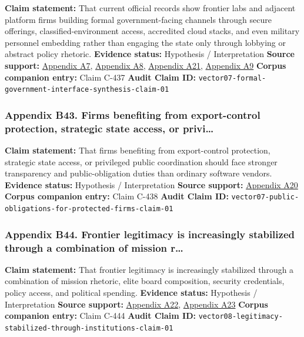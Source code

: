 \documentclass[
  american,
  11pt,
  letterpaper,
]{article}
\begin{document}
\textbf{Claim statement:} That current official records show frontier
labs and adjacent platform firms building formal government-facing
channels through secure offerings, classified-environment access,
accredited cloud stacks, and even military personnel embedding rather
than engaging the state only through lobbying or abstract policy
rhetoric. \textbf{Evidence status:} Hypothesis / Interpretation
\textbf{Source support:}
\hyperref[appendix-a7-introducing-openai-for-government]{Appendix A7},
\hyperref[appendix-a8-claude-gov-models-for-u-s-national-security-customers]{Appendix
A8},
\hyperref[appendix-a21-anthropic-and-palantir-partner-to-bring-claude-ai-models-to-aws-for-u-s-government-intelligence-and-defense-operations]{Appendix
A21},
\hyperref[appendix-a9-army-launches-detachment-201-executive-innovation-corps-to-drive-tech-transformation]{Appendix
A9} \textbf{Corpus companion entry:} Claim C-437 \textbf{Audit Claim
ID:} \texttt{vector07-formal-government-interface-synthesis-claim-01}

\subsubsection{Appendix B43. Firms benefiting from export-control
protection, strategic state access, or
privi\ldots{}}\label{appendix-b43-firms-benefiting-from-export-control-protection-strategic-state-access-or-privi}

\textbf{Claim statement:} That firms benefiting from export-control
protection, strategic state access, or privileged public coordination
should face stronger transparency and public-obligation duties than
ordinary software vendors. \textbf{Evidence status:} Hypothesis /
Interpretation \textbf{Source support:}
\hyperref[appendix-a20-openais-proposals-for-the-us-ai-action-plan]{Appendix
A20} \textbf{Corpus companion entry:} Claim C-438 \textbf{Audit Claim
ID:} \texttt{vector07-public-obligations-for-protected-firms-claim-01}

\subsubsection{Appendix B44. Frontier legitimacy is increasingly
stabilized through a combination of mission
r\ldots{}}\label{appendix-b44-frontier-legitimacy-is-increasingly-stabilized-through-a-combination-of-mission-r}

\textbf{Claim statement:} That frontier legitimacy is increasingly
stabilized through a combination of mission rhetoric, elite board
composition, security credentials, policy access, and political
spending. \textbf{Evidence status:} Hypothesis / Interpretation
\textbf{Source support:}
\hyperref[appendix-a22-anthropic-outspends-openai-in-biggest-ever-lobbying-quarter]{Appendix
A22},
\hyperref[appendix-a23-leading-the-future-committee-overview]{Appendix
A23} \textbf{Corpus companion entry:} Claim C-444 \textbf{Audit Claim
ID:}
\texttt{vector08-legitimacy-stabilized-through-institutions-claim-01}
\end{document}
